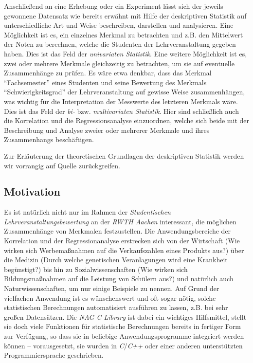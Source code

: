 Anschließend an eine Erhebung oder ein Experiment lässt sich  der jeweils gewonnene Datensatz wie bereits erwähnt mit Hilfe der deskriptiven Statistik auf unterschiedliche Art und Weise beschreiben, darstellen und analysieren. Eine Möglichkeit ist es, ein einzelnes Merkmal zu betrachten und z.B. den Mittelwert der Noten zu berechnen, welche die Studenten der Lehrveranstaltung gegeben haben. Dies ist das Feld der {\it univariaten Statistik}. Eine weitere Möglichkeit ist es, zwei oder mehrere Merkmale gleichzeitig zu betrachten, um sie auf eventuelle Zusammenhänge zu prüfen. Es wäre etwa denkbar, dass das Merkmal "`Fachsemester"' eines Studenten und seine Bewertung des Merkmals "`Schwierigkeitsgrad"' der Lehrveranstaltung auf gewisse Weise zusammenhängen, was wichtig für die Interpretation der Messwerte des letzteren Merkmals wäre. Dies ist das Feld der {\it bi-} bzw. {\it multivariaten Statistik}. Hier sind schließlich auch die Korrelation und die Regressionsanalyse einzuordnen, welche sich beide mit der Beschreibung und Analyse zweier oder mehrerer Merkmale und ihres Zusammenhangs beschäftigen.

Zur Erläuterung der theoretischen Grundlagen der deskriptiven Statistik werden wir vorrangig auf Quelle \cite{Fahrmeir2010} zurückgreifen.

\subsection{Motivation}

Es ist natürlich nicht nur im Rahmen der {\it Studentischen Lehrveranstaltungsbewertung} an der {\it RWTH Aachen} interessant, die möglichen Zusammenhänge von Merkmalen festzustellen. Die Anwendungsbereiche der Korrelation und der Regressionanalyse erstrecken sich von der Wirtschaft (Wie wirken sich Werbemaßnahmen auf die Verkaufszahlen eines Produkts aus?) über die Medizin (Durch welche genetischen Veranlagungen wird eine Krankheit begünstigt?) bis hin zu Sozialwissenschaften (Wie wirken sich Bildungsmaßnahmen auf die Leistung von Schülern aus?) und natürlich auch Naturwissenschaften, um nur einige Beispiele zu nennen. Auf Grund der vielfachen Anwendung ist es wünschenswert und oft sogar nötig, solche statistischen Berechnungen automatisiert ausführen zu lassen, z.B. bei sehr großen Datensätzen. Die {\it NAG C Library} ist dabei ein wichtiges Hilfsmittel, stellt sie doch viele Funktionen für statistische Berechnungen bereits in fertiger Form zur Verfügung, so dass sie in beliebige Anwendungsprogramme integriert werden können -- vorausgesetzt, sie wurden in {\it C}/{\it C++} oder einer anderen unterstützten Programmiersprache geschrieben.

